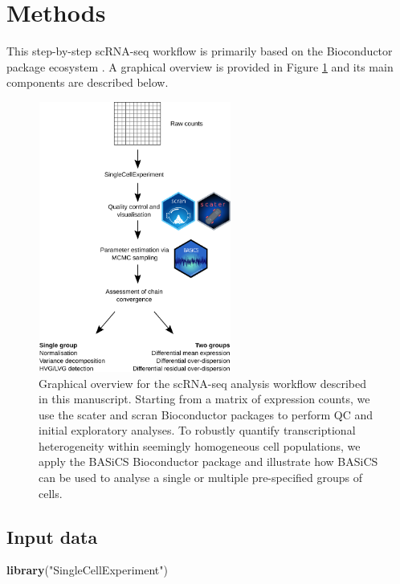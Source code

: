 \documentclass[9pt,a4paper,]{extarticle}
\newenvironment{Shaded}{\begin{snugshade}}{\end{snugshade}}
\newcommand{\KeywordTok}[1]{\textcolor[rgb]{0.13,0.29,0.53}{\textbf{#1}}}
\newcommand{\NormalTok}[1]{#1}
\newcommand{\StringTok}[1]{\textcolor[rgb]{0.31,0.60,0.02}{#1}}
\begin{document}
\hypertarget{methods}{%
\section{Methods}\label{methods}}

This step-by-step scRNA-seq workflow is primarily based on the Bioconductor
package ecosystem \citep{Amezquita2019}.
A graphical overview is provided in Figure \ref{fig:overview}
and its main components are described below.

\begin{figure}

{\centering \includegraphics[width=2.5in,height=3.5in]{figure/Overview} 

}

\caption{Graphical overview for the scRNA-seq analysis workflow described in this manuscript. Starting from a matrix of expression counts, we use the scater and scran Bioconductor packages to perform QC and initial exploratory analyses. To robustly quantify transcriptional heterogeneity within seemingly homogeneous cell populations, we apply the BASiCS Bioconductor package and  illustrate how BASiCS can be used to analyse a single or multiple pre-specified groups of cells.}\label{fig:overview}
\end{figure}

\hypertarget{input-data}{%
\subsection{Input data}\label{input-data}}

\begin{Shaded}
\begin{Highlighting}[]
\KeywordTok{library}\NormalTok{(}\StringTok{"SingleCellExperiment"}\NormalTok{)}
\end{Highlighting}
\end{Shaded}
\end{document}
